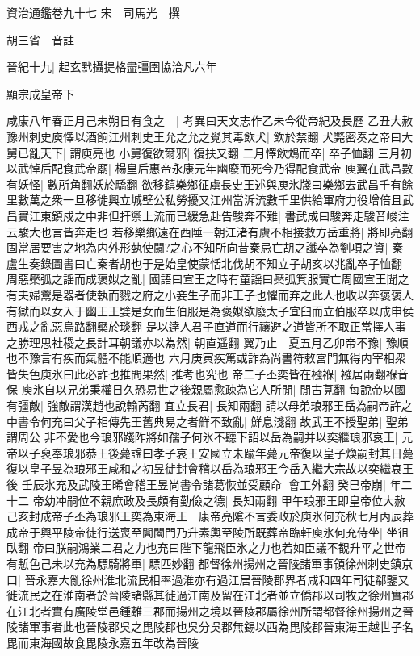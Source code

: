 資治通鑑卷九十七
宋　司馬光　撰

胡三省　音註

晉紀十九|{
	起玄黓攝提格盡彊圉協洽凡六年}


顯宗成皇帝下

咸康八年春正月己未朔日有食之　|{
	考異曰天文志作乙未今從帝紀及長歷}
乙丑大赦　豫州刺史庾懌以酒餉江州刺史王允之允之覺其毒飲犬|{
	飲於禁翻}
犬斃密奏之帝曰大舅已亂天下|{
	謂庾亮也}
小舅復欲爾邪|{
	復扶又翻}
二月懌飲鴆而卒|{
	卒子恤翻}
三月初以武悼后配食武帝廟|{
	楊皇后惠帝永康元年幽廢而死今乃得配食武帝}
庾翼在武昌數有妖怪|{
	數所角翻妖於驕翻}
欲移鎮樂鄉征虜長史王述與庾氷牋曰樂鄉去武昌千有餘里數萬之衆一旦移徙興立城壁公私勞擾又江州當泝流數千里供給軍府力役增倍且武昌實江東鎮戍之中非但扞禦上流而已緩急赴告駿奔不難|{
	書武成曰駿奔走駿音峻注云駿大也言皆奔走也}
若移樂鄉遠在西陲一朝江渚有虞不相接救方岳重將|{
	將即亮翻}
固當居要害之地為内外形埶使闚?之心不知所向昔秦忌亡胡之讖卒為劉項之資|{
	秦盧生奏錄圖書曰亡秦者胡也于是始皇使蒙恬北伐胡不知立子胡亥以兆亂卒子恤翻}
周惡檿弧之謡而成褒姒之亂|{
	國語曰宣王之時有童謡曰檿弧箕服實亡周國宣王聞之有夫婦鬻是器者使執而戮之府之小妾生子而非王子也懼而弃之此人也收以奔褒褒人有獄而以女入于幽王王嬖是女而生伯服是為褒姒欲廢太子宜臼而立伯服卒以成申侯西戎之亂惡烏路翻檿於琰翻}
是以逹人君子直道而行禳避之道皆所不取正當擇人事之勝理思社稷之長計耳朝議亦以為然|{
	朝直遥翻}
翼乃止　夏五月乙卯帝不豫|{
	豫順也不豫言有疾而氣體不能順適也}
六月庚寅疾篤或詐為尚書符敕宮門無得内宰相衆皆失色庾氷曰此必詐也推問果然|{
	推考也究也}
帝二子丕奕皆在襁褓|{
	襁居兩翻褓音保}
庾氷自以兄弟秉權日久恐易世之後親屬愈疎為它人所閒|{
	閒古莧翻}
每說帝以國有彊敵|{
	強敵謂漢趙也說輸芮翻}
宜立長君|{
	長知兩翻}
請以母弟琅邪王岳為嗣帝許之中書令何充曰父子相傳先王舊典易之者鮮不致亂|{
	鮮息淺翻}
故武王不授聖弟|{
	聖弟謂周公}
非不愛也今琅邪踐阼將如孺子何氷不聽下詔以岳為嗣并以奕繼琅邪哀王|{
	元帝以子裒奉琅邪恭王後薨諡曰孝子哀王安國立未踰年薨元帝復以皇子煥嗣封其日薨復以皇子昱為琅邪王咸和之初昱徙封會稽以岳為琅邪王今岳入繼大宗故以奕繼哀王後}
壬辰氷充及武陵王晞會稽王昱尚書令諸葛恢並受顧命|{
	會工外翻}
癸巳帝崩|{
	年二十二}
帝幼冲嗣位不親庶政及長頗有勤儉之德|{
	長知兩翻}
甲午琅邪王即皇帝位大赦己亥封成帝子丕為琅邪王奕為東海王　康帝亮隂不言委政於庾氷何充秋七月丙辰葬成帝于興平陵帝徒行送喪至閶闔門乃升素輿至陵所既葬帝臨軒庾氷何充侍坐|{
	坐徂臥翻}
帝曰朕嗣鴻業二君之力也充曰陛下龍飛臣氷之力也若如臣議不覩升平之世帝有慙色己未以充為驃騎將軍|{
	驃匹妙翻}
都督徐州揚州之晉陵諸軍事領徐州刺史鎮京口|{
	晉永嘉大亂徐州淮北流民相率過淮亦有過江居晉陵郡界者咸和四年司徒郗鑒又徙流民之在淮南者於晉陵諸縣其徙過江南及留在江北者並立僑郡以司牧之徐州實郡在江北者實有廣陵堂邑鍾離三郡而揚州之境以晉陵郡屬徐州所謂都督徐州揚州之晉陵諸軍事者此也晉陵郡吳之毘陵郡也吳分吳郡無錫以西為毘陵郡晉東海王越世子名毘而東海國故食毘陵永嘉五年改為晉陵}
